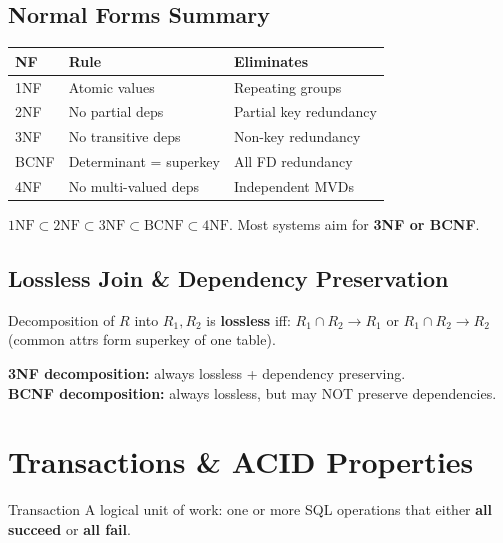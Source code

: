 \documentclass[12pt,a4paper]{article}
\begin{document}
\subsection{Normal Forms Summary}
\begin{center}
\begin{tabular}{@{}l p{4.5cm} p{4cm}@{}}
\toprule
\textbf{NF} & \textbf{Rule} & \textbf{Eliminates} \\
\midrule
1NF & Atomic values & Repeating groups \\
2NF & No partial deps & Partial key redundancy \\
3NF & No transitive deps & Non-key redundancy \\
BCNF & Determinant = superkey & All FD redundancy \\
4NF & No multi-valued deps & Independent MVDs \\
\bottomrule
\end{tabular}
\end{center}

$\text{1NF} \subset \text{2NF} \subset \text{3NF} \subset \text{BCNF} \subset \text{4NF}$. Most systems aim for \textbf{3NF or BCNF}.

\subsection{Lossless Join \& Dependency Preservation}
Decomposition of $R$ into $R_1, R_2$ is \textbf{lossless} iff:
$R_1 \cap R_2 \to R_1$ or $R_1 \cap R_2 \to R_2$ (common attrs form superkey of one table).

\textbf{3NF decomposition:} always lossless + dependency preserving.\\
\textbf{BCNF decomposition:} always lossless, but may NOT preserve dependencies.

\section{Transactions \& ACID Properties}

\begin{conceptbox}{Transaction}
A logical unit of work: one or more SQL operations that either \textbf{all succeed} or \textbf{all fail}.
\end{conceptbox}
\end{document}
